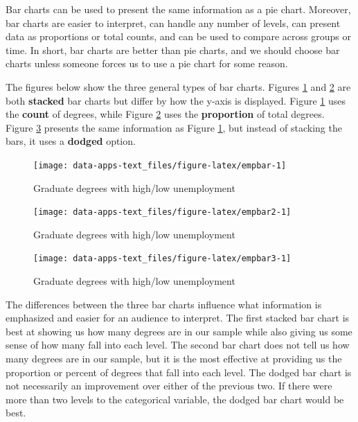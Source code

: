 \documentclass[
]{book}
\begin{document}
Bar charts can be used to present the same information as a pie chart. Moreover, bar charts are easier to interpret, can handle any number of levels, can present data as proportions or total counts, and can be used to compare across groups or time. In short, bar charts are better than pie charts, and we should choose bar charts unless someone forces us to use a pie chart for some reason.

The figures below show the three general types of bar charts. Figures \ref{fig:empbar} and \ref{fig:empbar2} are both \textbf{stacked} bar charts but differ by how the y-axis is displayed. Figure \ref{fig:empbar} uses the \textbf{count} of degrees, while Figure \ref{fig:empbar2} uses the \textbf{proportion} of total degrees. Figure \ref{fig:empbar3} presents the same information as Figure \ref{fig:empbar}, but instead of stacking the bars, it uses a \textbf{dodged} option.

\begin{figure}

{\centering \texttt{[image: data-apps-text\_files/figure-latex/empbar-1]} 

}

\caption{Graduate degrees with high/low unemployment}\label{fig:empbar}
\end{figure}

\begin{figure}

{\centering \texttt{[image: data-apps-text\_files/figure-latex/empbar2-1]} 

}

\caption{Graduate degrees with high/low unemployment}\label{fig:empbar2}
\end{figure}

\begin{figure}

{\centering \texttt{[image: data-apps-text\_files/figure-latex/empbar3-1]} 

}

\caption{Graduate degrees with high/low unemployment}\label{fig:empbar3}
\end{figure}

The differences between the three bar charts influence what information is emphasized and easier for an audience to interpret. The first stacked bar chart is best at showing us how many degrees are in our sample while also giving us some sense of how many fall into each level. The second bar chart does not tell us how many degrees are in our sample, but it is the most effective at providing us the proportion or percent of degrees that fall into each level. The dodged bar chart is not necessarily an improvement over either of the previous two. If there were more than two levels to the categorical variable, the dodged bar chart would be best.
\end{document}
